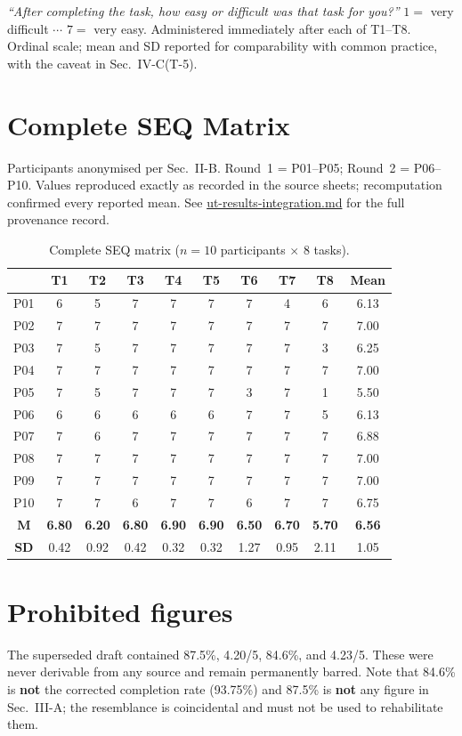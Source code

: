 \documentclass[conference]{IEEEtran}
\begin{document}
\emph{``After completing the task, how easy or difficult was that task for
you?''} $1 = $ very difficult $\cdots$ $7 = $ very easy. Administered immediately
after each of T1--T8. Ordinal scale; mean and SD reported for comparability
with common practice, with the caveat in Sec.~IV-C(T-5).

\section{Complete SEQ Matrix}

Participants anonymised per Sec.~II-B. Round~1 = P01--P05; Round~2 =
P06--P10. Values reproduced exactly as recorded in the source sheets;
recomputation confirmed every reported mean. See
\url{ut-results-integration.md} for the full provenance record.

\begin{table}[h]
\caption{Complete SEQ matrix ($n=10$ participants $\times$ 8 tasks).}
\label{app:matrix}
\centering
\begin{tabular}{@{}cccccccccc@{}}
\toprule
 & T1 & T2 & T3 & T4 & T5 & T6 & T7 & T8 & Mean \\
\midrule
P01 & 6 & 5 & 7 & 7 & 7 & 7 & 4 & 6 & 6.13 \\
P02 & 7 & 7 & 7 & 7 & 7 & 7 & 7 & 7 & 7.00 \\
P03 & 7 & 5 & 7 & 7 & 7 & 7 & 7 & 3 & 6.25 \\
P04 & 7 & 7 & 7 & 7 & 7 & 7 & 7 & 7 & 7.00 \\
P05 & 7 & 5 & 7 & 7 & 7 & 3 & 7 & 1 & 5.50 \\
P06 & 6 & 6 & 6 & 6 & 6 & 7 & 7 & 5 & 6.13 \\
P07 & 7 & 6 & 7 & 7 & 7 & 7 & 7 & 7 & 6.88 \\
P08 & 7 & 7 & 7 & 7 & 7 & 7 & 7 & 7 & 7.00 \\
P09 & 7 & 7 & 7 & 7 & 7 & 7 & 7 & 7 & 7.00 \\
P10 & 7 & 7 & 6 & 7 & 7 & 6 & 7 & 7 & 6.75 \\
\midrule
\textbf{M} & \textbf{6.80} & \textbf{6.20} & \textbf{6.80} & \textbf{6.90} & \textbf{6.90} & \textbf{6.50} & \textbf{6.70} & \textbf{5.70} & \textbf{6.56} \\
\textbf{SD} & 0.42 & 0.92 & 0.42 & 0.32 & 0.32 & 1.27 & 0.95 & 2.11 & 1.05 \\
\bottomrule
\end{tabular}
\end{table}

\section*{Prohibited figures}

The superseded draft contained 87.5\%, 4.20/5, 84.6\%, and 4.23/5. These were
never derivable from any source and remain permanently barred. Note that
84.6\% is \textbf{not} the corrected completion rate (93.75\%) and 87.5\% is
\textbf{not} any figure in Sec.~III-A; the resemblance is coincidental and must
not be used to rehabilitate them.
\end{document}
